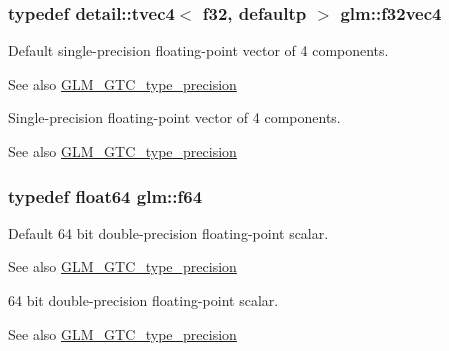 \subsubsection[{\texorpdfstring{f32vec4}{f32vec4}}]{\setlength{\rightskip}{0pt plus 5cm}typedef detail\+::tvec4$<$ f32, defaultp $>$ {\bf glm\+::f32vec4}}\hypertarget{group__gtc__type__precision_gab6254ab9d409cce6579d7dc75dd34114}{}\label{group__gtc__type__precision_gab6254ab9d409cce6579d7dc75dd34114}
Default single-\/precision floating-\/point vector of 4 components. \begin{DoxySeeAlso}{See also}
\hyperlink{group__gtc__type__precision}{G\+L\+M\+\_\+\+G\+T\+C\+\_\+type\+\_\+precision}
\end{DoxySeeAlso}
Single-\/precision floating-\/point vector of 4 components. \begin{DoxySeeAlso}{See also}
\hyperlink{group__gtc__type__precision}{G\+L\+M\+\_\+\+G\+T\+C\+\_\+type\+\_\+precision} 
\end{DoxySeeAlso}
\subsubsection[{\texorpdfstring{f64}{f64}}]{\setlength{\rightskip}{0pt plus 5cm}typedef float64 {\bf glm\+::f64}}\hypertarget{group__gtc__type__precision_ga2bba392e555124b36cde6abba349bab3}{}\label{group__gtc__type__precision_ga2bba392e555124b36cde6abba349bab3}
Default 64 bit double-\/precision floating-\/point scalar. \begin{DoxySeeAlso}{See also}
\hyperlink{group__gtc__type__precision}{G\+L\+M\+\_\+\+G\+T\+C\+\_\+type\+\_\+precision}
\end{DoxySeeAlso}
64 bit double-\/precision floating-\/point scalar. \begin{DoxySeeAlso}{See also}
\hyperlink{group__gtc__type__precision}{G\+L\+M\+\_\+\+G\+T\+C\+\_\+type\+\_\+precision} 
\end{DoxySeeAlso}
